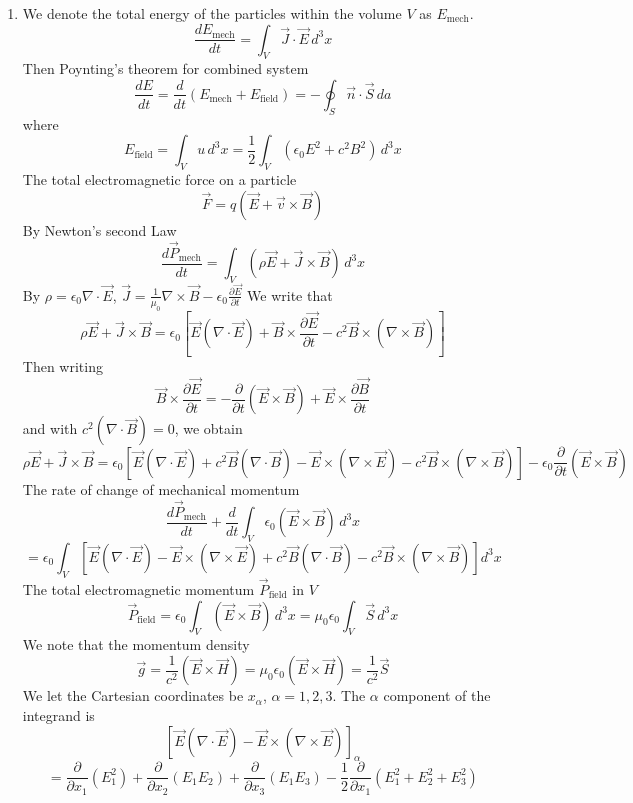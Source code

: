 \documentclass{article}
\begin{document}
\begin{enumerate}
		\item We denote the total energy of the particles within the volume $V$ as $E_{\text{mech}}$.
		\[ \frac{dE_{\text{mech}}}{dt} = \int_V \vec{J} \cdot \vec{E} \, d^3x \]
		Then Poynting's theorem for combined system
		\[ \frac{dE}{dt} = \frac{d}{dt} (E_{\text{mech}} + E_{\text{field}}) = - \oint_S \vec{n} \cdot \vec{S} \, da \]
		where
		\[ E_{\text{field}} = \int_V u \, d^3x = \frac{1}{2} \int_V (\epsilon_0 E^2 + c^2 B^2) \, d^3x \]
		The total electromagnetic force on a particle
		\[ \vec{F} = q(\vec{E} + \vec{v} \times \vec{B}) \]
		By Newton's second Law
		\[ \frac{d\vec{P}_{\text{mech}}}{dt} = \int_V (\rho \vec{E} + \vec{J} \times \vec{B}) \, d^3x \]
		By $\rho = \epsilon_0 \nabla \cdot \vec{E}$, $\vec{J} = \frac{1}{\mu_0} \nabla \times \vec{B} - \epsilon_0 \frac{\partial \vec{E}}{\partial t}$
		We write that
		\[ \rho\vec{E} + \vec{J} \times \vec{B} = \epsilon_0 \left[ \vec{E}(\nabla \cdot \vec{E}) + \vec{B} \times \frac{\partial \vec{E}}{\partial t} - c^2 \vec{B} \times (\nabla \times \vec{B}) \right] \]
		Then writing
		\[ \vec{B} \times \frac{\partial \vec{E}}{\partial t} = -\frac{\partial}{\partial t}(\vec{E} \times \vec{B}) + \vec{E} \times \frac{\partial \vec{B}}{\partial t} \]
		and with $c^2(\nabla \cdot \vec{B}) = 0$, we obtain
		\[ \rho\vec{E} + \vec{J} \times \vec{B} = \epsilon_0 \left[ \vec{E}(\nabla \cdot \vec{E}) + c^2 \vec{B}(\nabla \cdot \vec{B}) - \vec{E} \times (\nabla \times \vec{E}) - c^2 \vec{B} \times (\nabla \times \vec{B}) \right] - \epsilon_0 \frac{\partial}{\partial t}(\vec{E} \times \vec{B}) \]
		The rate of change of mechanical momentum
		\[ \frac{d\vec{P}_{\text{mech}}}{dt} + \frac{d}{dt} \int_V \epsilon_0 (\vec{E} \times \vec{B}) \, d^3x \]
		\[ = \epsilon_0 \int_V \left[ \vec{E}(\nabla \cdot \vec{E}) - \vec{E} \times (\nabla \times \vec{E}) + c^2 \vec{B}(\nabla \cdot \vec{B}) - c^2 \vec{B} \times (\nabla \times \vec{B}) \right] d^3x \]
		The total electromagnetic momentum $\vec{P}_{\text{field}}$ in $V$
		\[ \vec{P}_{\text{field}} = \epsilon_0 \int_V (\vec{E} \times \vec{B}) \, d^3x = \mu_0 \epsilon_0 \int_V \vec{S} \, d^3x \]
		We note that the momentum density
		\[ \vec{g} = \frac{1}{c^2}(\vec{E} \times \vec{H}) = \mu_0 \epsilon_0 (\vec{E} \times \vec{H}) = \frac{1}{c^2} \vec{S} \]
		We let the Cartesian coordinates be $x_\alpha$, $\alpha = 1, 2, 3$.
		The $\alpha$ component of the integrand is
		\[ [ \vec{E}(\nabla \cdot \vec{E}) - \vec{E} \times (\nabla \times \vec{E}) ]_\alpha \]
		\[ = \frac{\partial}{\partial x_1} (E_1^2) + \frac{\partial}{\partial x_2} (E_1 E_2) + \frac{\partial}{\partial x_3} (E_1 E_3) - \frac{1}{2} \frac{\partial}{\partial x_1} (E_1^2 + E_2^2 + E_3^2) \]

\end{enumerate}
\end{document}
